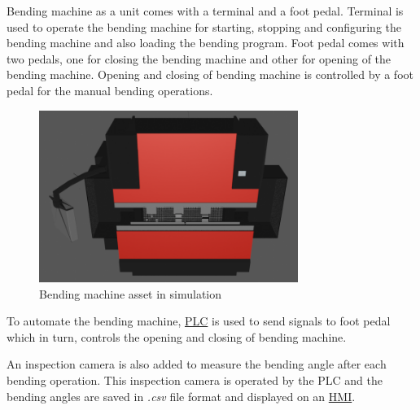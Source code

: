 
Bending machine as a unit comes with a terminal and a foot pedal. Terminal is used to operate
the bending machine for starting, stopping and configuring the bending machine and also loading the bending program.
Foot pedal comes with two pedals, one for closing the bending machine and other for opening of the bending machine.
Opening and closing of bending machine is controlled by a foot pedal for the manual bending operations.

\begin{figure}[h]
    \centering
    \includegraphics[width=0.75\textwidth]{figures/bending-machine-blender.png}
    \caption{Bending machine asset in simulation}
    \label{fig:bending-machine-blender}
\end{figure}
To automate the bending machine, \hyperref[acro:PLC]{PLC} is used to send signals to foot pedal which in turn, controls the opening and closing of bending machine.

An inspection camera is also added to measure the bending angle after each bending operation. This inspection camera is operated by the PLC
and the bending angles are saved in \textit{.csv} file format and displayed on an \hyperref[acro:HMI]{HMI}.

